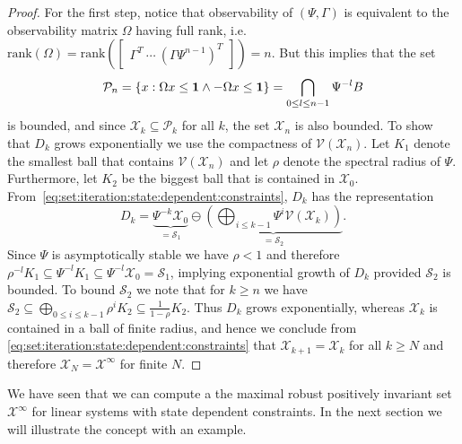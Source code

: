 \documentclass[letterpaper, 10pt, conference]{ieeeconf} %
\begin{document}
\begin{proof}
For the first step, notice that observability of
$(\Psi,\Gamma)$ is equivalent to the observability matrix $\Omega$ having full rank, i.e.\ $\mathrm{rank}(\Omega) = \mathrm{rank}(\begin{bmatrix} \Gamma^T \ \cdots \ (\Gamma\Psi^{n-1})^T\end{bmatrix}) = n$.
But  this implies that the set 
\[
\mathcal P_{n} = \{x: 
\Omega x\leq{\bf{1}}\wedge-\Omega x\leq{\bf{1}}\} = \bigcap_{0\leq l\leq n-1} \Psi^{-l} B
\]
is bounded, and since $\mathcal X_k\subseteq \mathcal P_k$ for all $k$, 
the set $\mathcal X_{n}$ is also bounded. 
To show that $D_k$ grows exponentially we use the compactness of $\mathcal V(\mathcal X_{n})$. Let $K_1$ denote the smallest ball that contains $\mathcal V(\mathcal X_{n})$ and let
$\rho$ denote the spectral radius of $\Psi$. Furthermore, let $K_2$
be the biggest ball that is contained in $\mathcal X_{0}$. From~\eqref{eq:set:iteration:state:dependent:constraints}, $D_k$ has the representation
\begin{equation}
D_k = \underbrace{\Psi^{-k}\mathcal X_0}_{=\mathcal S_1} \ominus \underbrace{\left(\bigoplus_{i\leq k-1} 
\Psi^i\mathcal V(\mathcal X_k)\right)}_{=\mathcal S_2}.
\end{equation}
Since $\Psi$ is asymptotically stable we have $\rho<1$ and therefore
$\rho^{-l}K_1\subseteq\Psi^{-l} K_1 \subseteq \Psi^{-l}\mathcal X_0 = \mathcal S_1$,
implying exponential growth of $D_k$ provided $\mathcal S_2$ is bounded. 
To bound $\mathcal S_2$ we note that for $k\geq n$ we have $\mathcal S_2\subseteq \bigoplus_{0\leq i\leq k-1} \rho^i K_2 \subseteq
\frac{1}{1-\rho} K_2$.
Thus $D_k$ grows exponentially,
whereas $\mathcal X_k$ is contained in a ball of
finite radius, and hence we conclude from \eqref{eq:set:iteration:state:dependent:constraints} that 
$\mathcal X_{k+1} = \mathcal X _k$ for all $k\geq N$ and therefore $\mathcal X _N = \mathcal X^\infty$ for finite $N$.
\end{proof}
%
We have seen that we can compute a the maximal robust positively invariant set $\mathcal X^\infty$ for linear 
systems with state dependent constraints. In the next section we will illustrate the concept with an 
example.
%
%
%
\end{document}
